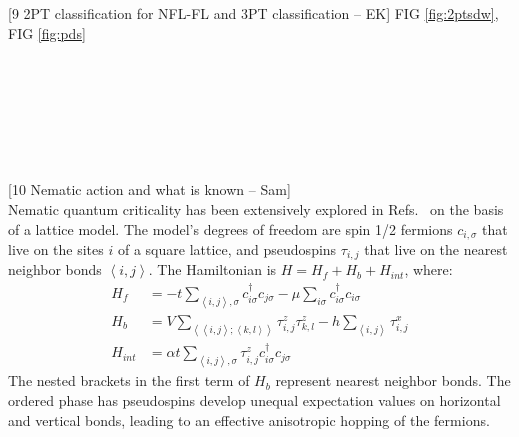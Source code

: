 \documentclass[amsmath,amssymb, aps, prx, longbibliography, twocolumn]{revtex4-1}
\begin{document}
[9 2PT classification for NFL-FL and 3PT classification -- EK]
FIG \ref{fig:2ptsdw}, FIG \ref{fig:pds}
\\
\\
\\
\\
\\
\\
\\
\\




[10 Nematic action and what is known -- Sam]\\
Nematic quantum criticality has been extensively explored in Refs.~\cite{PhysRevX.6.031028,Lederer4905} on the basis of a lattice model. The model's degrees of freedom are spin 1/2 fermions $c_{i,\sigma}$ that live on the sites $i$ of a square lattice, and pseudospins $\tau_{i,j}$ that live on the nearest neighbor bonds $\left<i,j\right>$. The Hamiltonian is $H = H_{f} + H_{b} + H_{int}$, where:
\begin{align}
\label{Eq:Nematic}
    H_{f} &= -t\sum_{\left<i,j\right>,\sigma}c_{i\sigma}^{\dagger}c_{j\sigma}-\mu \sum_{i\sigma}c_{i\sigma}^{\dagger}c_{i\sigma} \nonumber \\
    H_{b} &= V \sum_{\left<\left<i,j\right>;\left<k,l\right>\right>}\tau^{z}_{i,j}\tau^{z}_{k,l}-h\sum_{\left<i,j\right>}\tau^{x}_{i,j}\\
    H_{int} &= \alpha t\sum_{\left<i,j\right>,\sigma}\tau^{z}_{i,j}c_{i\sigma}^{\dagger}c_{j\sigma} \nonumber
\end{align}
The nested brackets in the first term of $H_{b}$ represent nearest neighbor bonds. The ordered phase has pseudospins develop unequal expectation values on horizontal and vertical bonds, leading to an effective anisotropic hopping of the fermions.  
 
\end{document}
